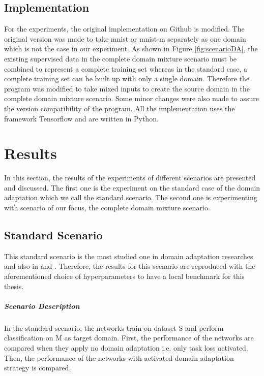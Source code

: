 \subsection*{Implementation}
For the experiments, the original implementation on Github \cite{dsnGithub} is modified. The original version was made to take mnist or mnist-m separately as one domain which is not the case in our experiment. As shown in Figure \ref{fig:scenarioDA}, the existing supervised data in the complete domain mixture scenario must be combined to represent a complete training set whereas in the standard case, a complete training set can be built up with only a single domain. Therefore the program was modified to take mixed inputs to create the source domain in the complete domain mixture scenario. Some minor changes were also made to assure the version compatibility of the program. All the implementation uses the framework Tensorflow and are written in Python.

\section{Results}
In this section, the results of the experiments of different scenarios are presented and discussed. The first one is the experiment on the standard case of the domain adaptation which we call the standard scenario. The second one is experimenting with scenario of our focus, the complete domain mixture scenario. 

\subsection*{Standard Scenario}
This standard scenario is the most studied one in domain adaptation researches and also in \cite{DSN} and \cite{domainMixture}. Therefore, the results for this scenario are reproduced with the aforementioned choice of hyperparameters to have a local benchmark for this thesis.
 
\subparagraph*{Scenario Description} In the standard scenario, the networks train on dataset S and perform classification on M as target domain. First, the performance of the networks are compared when they apply no domain adaptation i.e. only task loss activated. Then, the performance of the networks with activated domain adaptation strategy is compared.
 
